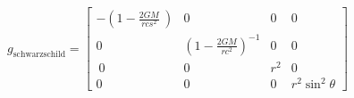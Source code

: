 \documentclass[preview]{standalone}
\begin{document}
\begin{align*}
g_\text{schwarzschild} = \begin{bmatrix} -\left(1 - \frac{2GM}{rcs^2}\
                \right)  & 0 & 0 & 0 \\ 0 & \left(1 - \frac{2GM}{rc^2}\right)^{-1} & 0 & 0 \\ \
                0 & 0 & r^2 & 0 \\ 0 & 0 & 0 & r^2\sin^2 \theta \end{bmatrix}
\end{align*}
\end{document}
